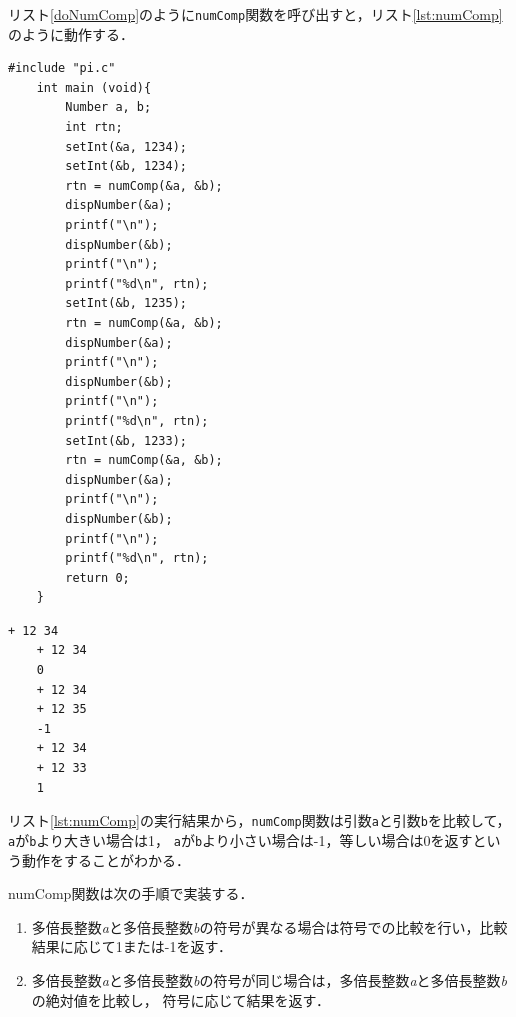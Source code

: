\documentclass[a4paper,11pt,dvipdfmx]{jsarticle}
\begin{document}
リスト\ref{doNumComp}のように\texttt{numComp}関数を呼び出すと，リスト\ref{lst:numComp}のように動作する．
\begin{lstlisting}[caption=\texttt{numComp}関数の呼び出し,label=doNumComp]
    #include "pi.c"
    int main (void){
        Number a, b;
        int rtn;
        setInt(&a, 1234);
        setInt(&b, 1234);
        rtn = numComp(&a, &b);
        dispNumber(&a);
        printf("\n");
        dispNumber(&b);
        printf("\n");
        printf("%d\n", rtn);
        setInt(&b, 1235);
        rtn = numComp(&a, &b);
        dispNumber(&a);
        printf("\n");
        dispNumber(&b);
        printf("\n");
        printf("%d\n", rtn);
        setInt(&b, 1233);
        rtn = numComp(&a, &b);
        dispNumber(&a);
        printf("\n");
        dispNumber(&b);
        printf("\n");
        printf("%d\n", rtn);
        return 0;
    }
\end{lstlisting}

\begin{lstlisting}[caption=リスト\ref{doNumComp}の実行結果,label=lst:numComp]
    + 12 34
    + 12 34
    0
    + 12 34
    + 12 35
    -1
    + 12 34
    + 12 33
    1
\end{lstlisting}

リスト\ref{lst:numComp}の実行結果から，\texttt{numComp}関数は引数\texttt{a}と引数\texttt{b}を比較して，\texttt{a}が\texttt{b}より大きい場合は1，
\texttt{a}が\texttt{b}より小さい場合は-1，等しい場合は0を返すという動作をすることがわかる．

numComp関数は次の手順で実装する．
\begin{enumerate}
    \item 多倍長整数\textit{a}と多倍長整数\textit{b}の符号が異なる場合は符号での比較を行い，比較結果に応じて1または-1を返す．
    \item 多倍長整数\textit{a}と多倍長整数\textit{b}の符号が同じ場合は，多倍長整数\textit{a}と多倍長整数\textit{b}の絶対値を比較し，
    符号に応じて結果を返す．
\end{enumerate}
\end{document}
